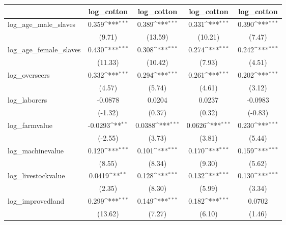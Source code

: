 {
\def\sym#1{\ifmmode^{#1}\else\(^{#1}\)\fi}
\begin{tabular}{l*{4}{c}}
\hline\hline
            &\multicolumn{1}{c}{log\_cotton}&\multicolumn{1}{c}{log\_cotton}&\multicolumn{1}{c}{log\_cotton}&\multicolumn{1}{c}{log\_cotton}\\
\hline
log\_age\_male\_slaves&       0.359\sym{***}&       0.389\sym{***}&       0.331\sym{***}&       0.390\sym{***}\\
            &      (9.71)         &     (13.59)         &     (10.21)         &      (7.47)         \\
[1em]
log\_age\_female\_slaves&       0.430\sym{***}&       0.308\sym{***}&       0.274\sym{***}&       0.242\sym{***}\\
            &     (11.33)         &     (10.42)         &      (7.93)         &      (4.51)         \\
[1em]
log\_overseers&       0.332\sym{***}&       0.294\sym{***}&       0.261\sym{***}&       0.202\sym{***}\\
            &      (4.57)         &      (5.74)         &      (4.61)         &      (3.12)         \\
[1em]
log\_laborers&     -0.0878         &      0.0204         &      0.0237         &     -0.0983         \\
            &     (-1.32)         &      (0.37)         &      (0.32)         &     (-0.83)         \\
[1em]
log\_farmvalue&     -0.0293\sym{**} &      0.0388\sym{***}&      0.0626\sym{***}&       0.230\sym{***}\\
            &     (-2.55)         &      (3.73)         &      (3.81)         &      (5.44)         \\
[1em]
log\_machinevalue&       0.120\sym{***}&       0.101\sym{***}&       0.170\sym{***}&       0.159\sym{***}\\
            &      (8.55)         &      (8.34)         &      (9.30)         &      (5.62)         \\
[1em]
log\_livestockvalue&      0.0419\sym{**} &       0.128\sym{***}&       0.132\sym{***}&       0.130\sym{***}\\
            &      (2.35)         &      (8.30)         &      (5.99)         &      (3.34)         \\
[1em]
log\_improvedland&       0.299\sym{***}&       0.149\sym{***}&       0.182\sym{***}&      0.0702         \\
            &     (13.62)         &      (7.27)         &      (6.10)         &      (1.46)         \\

\end{tabular}}
